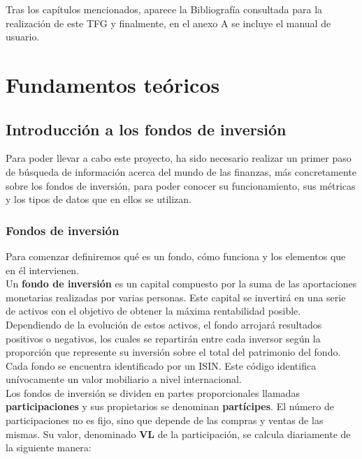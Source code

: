 \documentclass[12pt, a4paper]{book}
\begin{document}
Tras los capítulos mencionados, aparece la Bibliografía consultada para la realización de este \gls{TFG} y finalmente, en el anexo A se incluye el manual de usuario.\\

\newpage

\chapter{Fundamentos teóricos}

\section{Introducción a los fondos de inversión}

Para poder llevar a cabo este proyecto, ha sido necesario realizar un primer paso de búsqueda de información acerca del mundo de las finanzas, más concretamente sobre los fondos de inversión, para poder conocer su funcionamiento, sus métricas y los tipos de datos que en ellos se utilizan.\\

\subsection{Fondos de inversión}

Para comenzar definiremos qué es un fondo, cómo funciona y los elementos que en él intervienen.\\

Un \textbf{fondo de inversión} es un capital compuesto por la suma de las aportaciones monetarias realizadas por varias personas. Este capital se invertirá en una serie de activos con el objetivo de obtener la máxima rentabilidad posible. Dependiendo de la evolución de estos activos, el fondo arrojará resultados positivos o negativos, los cuales se repartirán entre cada inversor según la proporción que represente su inversión sobre el total del patrimonio del fondo. Cada fondo se encuentra identificado por un \gls{ISIN}. Este código identifica unívocamente un valor mobiliario a nivel internacional.\\

Los fondos de inversión se dividen en partes proporcionales llamadas \textbf{participaciones} y sus propietarios se denominan \textbf{partícipes}. El número de participaciones no es fijo, sino que depende de las compras y ventas de las mismas. Su valor, denominado \textbf{\gls{VL}} de la participación, se calcula diariamente de la siguiente manera: 
	
\end{document}
